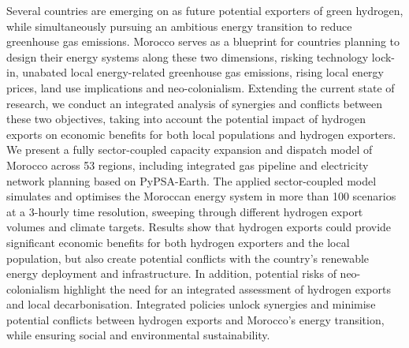 Several countries are emerging on as future potential exporters of green hydrogen, while simultaneously pursuing an ambitious energy transition to reduce greenhouse gas emissions. 
Morocco serves as a blueprint for countries planning to design their energy systems along these two dimensions, risking technology lock-in, unabated local energy-related greenhouse gas emissions, rising local energy prices, land use implications and neo-colonialism. 
Extending the current state of research, we conduct an integrated analysis of synergies and conflicts between these two objectives, taking into account the potential impact of hydrogen exports on economic benefits for both local populations and hydrogen exporters. We present a fully sector-coupled capacity expansion and dispatch model of Morocco across 53 regions, including integrated gas pipeline and electricity network planning based on PyPSA-Earth. The applied sector-coupled model simulates and optimises the Moroccan energy system in more than 100 scenarios at a 3-hourly time resolution, sweeping through different hydrogen export volumes and climate targets. 
Results show that hydrogen exports could provide significant economic benefits for both hydrogen exporters and the local population, but also create potential conflicts with the country's renewable energy deployment and infrastructure.
In addition, potential risks of neo-colonialism highlight the need for an integrated assessment of hydrogen exports and local decarbonisation. Integrated policies unlock synergies and minimise potential conflicts between hydrogen exports and Morocco's energy transition, while ensuring social and environmental sustainability.